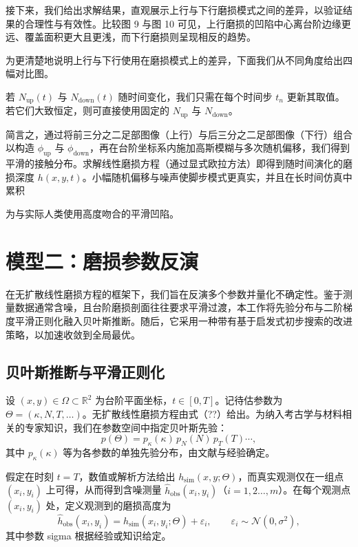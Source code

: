 \documentclass[11pt,a4paper,fontset=windows]{ctexart}
\newcommand{\R}{\mathbb{R}}
\begin{document}
接下来，我们给出求解结果，直观展示上行与下行磨损模式之间的差异，以验证结果的合理性与有效性。比较图 9 与图 10 可见，上行磨损的凹陷中心离台阶边缘更远、覆盖面积更大且更浅，而下行磨损则呈现相反的趋势。

为更清楚地说明上行与下行使用在磨损模式上的差异，下面我们从不同角度给出四幅对比图。

若 $N_{\text{up}}(t)$ 与 $N_{\text{down}}(t)$ 随时间变化，我们只需在每个时间步 $t_n$ 更新其取值。若它们大致恒定，则可直接使用固定的 $N_{\text{up}}$ 与 $N_{\text{down}}$。

简言之，通过将前三分之二足部图像（上行）与后三分之二足部图像（下行）组合以构造 $\phi_{\text{up}}$ 与 $\phi_{\text{down}}$，再在台阶坐标系内施加高斯模糊与多次随机偏移，我们得到平滑的接触分布。求解线性磨损方程（通过显式欧拉方法）即得到随时间演化的磨损深度 $h(x,y,t)$。小幅随机偏移与噪声使脚步模式更真实，并且在长时间仿真中累积

为与实际人类使用高度吻合的平滑凹陷。

\section{模型二：磨损参数反演}

在无扩散线性磨损方程的框架下，我们旨在反演多个参数并量化不确定性。鉴于测量数据通常含噪，且台阶磨损剖面往往要求平滑过渡，本工作将先验分布与二阶梯度平滑正则化融入贝叶斯推断。随后，它采用一种带有基于启发式初步搜索的改进策略，以加速收敛到全局最优。

\subsection{贝叶斯推断与平滑正则化\cite{7}}

设 $(x,y)\in\Omega\subset\R^2$ 为台阶平面坐标，$t\in[0,T]$。记待估参数为 $\Theta=(\kappa,N,T,\dots)$。无扩散线性磨损方程由式（??）给出。为纳入考古学与材料相关的专家知识，我们在参数空间中指定贝叶斯先验：
\[
p(\Theta)=p_{\kappa}(\kappa)\,p_{N}(N)\,p_{T}(T)\cdots,
\]
其中 $p_{\kappa}(\kappa)$ 等为各参数的单独先验分布，由文献与经验确定。

假定在时刻 $t=T$，数值或解析方法给出 $h_{\text{sim}}(x,y;\Theta)$，而真实观测仅在一组点 $(x_i,y_i)$ 上可得，从而得到含噪测量 $\hat{h}_{\text{obs}}(x_i,y_i)$（$i=1,2\dots,m$）。在每个观测点 $(x_i,y_i)$ 处，定义观测到的磨损高度为
\[
\hat{h}_{\text{obs}}(x_i,y_i)=h_{\text{sim}}(x_i,y_i;\Theta)+\varepsilon_i,
\qquad \varepsilon_i\sim\mathcal{N}(0,\sigma^2),
\]
其中参数 sigma 根据经验或知识给定。
\end{document}
